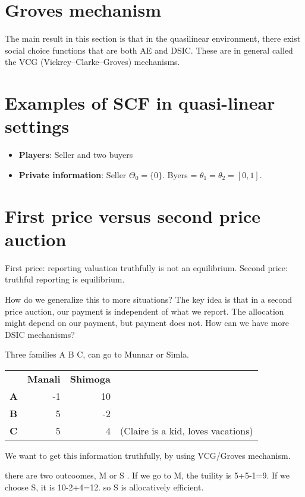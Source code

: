 \documentclass[10pt,a4paper]{article}
\begin{document}
\section{Groves mechanism}
The main result in this section is that in the quasilinear environment, there exist
social choice functions that are both AE and DSIC. These are in general called the VCG
(Vickrey–Clarke–Groves) mechanisms.



\section{Examples of SCF in quasi-linear settings}
\begin{itemize}
    \item \textbf{Players}: Seller and two buyers
    \item \textbf{Private information}: Seller $\Theta_0 = \{ 0 \}$. Byers = $\theta_1 =\theta_2 = [0, 1]$.
\end{itemize}

\section{First price versus second price auction}
First price: reporting valuation truthfully is not an equilibrium. Second
price: truthful reporting is equilibrium.

How do we generalize this to more situations? The key idea is that in a second
price auction, our payment is independent of what we report. The allocation
might depend on our payment, but payment does not. How can we have more
DSIC mechanisms?

Three families A B C, can go to Munnar or Simla. 


\begin{tabular}{l r r l}
  &  \textbf{Manali} &  \textbf{Shimoga} & \\
\textbf{A} & -1 &  10 & \\
\textbf{B} & 5  & -2  & \\
\textbf{C} & 5  & 4  & (Claire is a kid, loves vacations) \\
\end{tabular}

We want to get this information truthfully, by using VCG/Groves mechanism.

there are two outcoomes, M or S . If we go to M, the tuility is 5+5-1=9. If
we choose S, it is 10-2+4=12. so S is allocatively efficient.
\end{document}
